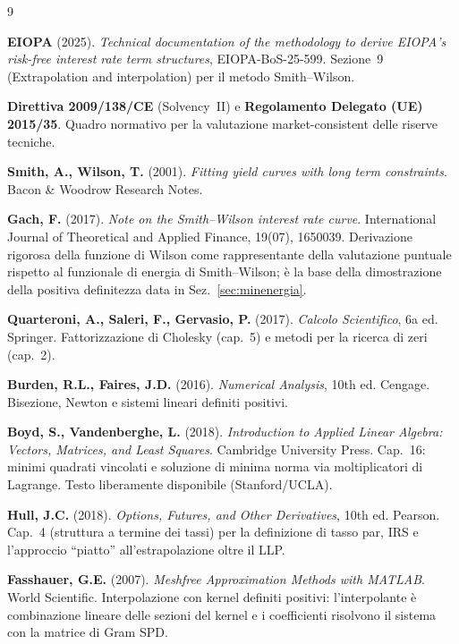 \documentclass[11pt,a4paper]{article}
\theoremstyle{plain}
\theoremstyle{definition}
\theoremstyle{remark}
\begin{document}
\renewcommand{\refname}{Riferimenti bibliografici}
\begin{thebibliography}{9}

  \textbf{EIOPA} (2025).
  \textit{Technical documentation of the methodology to derive EIOPA's risk-free interest rate
  term structures}, EIOPA-BoS-25-599.
  Sezione~9 (Extrapolation and interpolation) per il metodo Smith--Wilson.

  \textbf{Direttiva 2009/138/CE} (Solvency~II) e
  \textbf{Regolamento Delegato (UE) 2015/35}.
  Quadro normativo per la valutazione market-consistent delle riserve tecniche.

  \textbf{Smith, A., Wilson, T.} (2001).
  \textit{Fitting yield curves with long term constraints}.
  Bacon \& Woodrow Research Notes.

  \textbf{Gach, F.} (2017).
  \textit{Note on the Smith--Wilson interest rate curve}.
  International Journal of Theoretical and Applied Finance, 19(07), 1650039.
  Derivazione rigorosa della funzione di Wilson come rappresentante della valutazione puntuale
  rispetto al funzionale di energia di Smith--Wilson; \`e la base della dimostrazione della
  positiva definitezza data in Sez.~\ref{sec:minenergia}.

  \textbf{Quarteroni, A., Saleri, F., Gervasio, P.} (2017).
  \textit{Calcolo Scientifico}, 6a ed. Springer.
  Fattorizzazione di Cholesky (cap.~5) e metodi per la ricerca di zeri (cap.~2).

  \textbf{Burden, R.L., Faires, J.D.} (2016).
  \textit{Numerical Analysis}, 10th ed. Cengage.
  Bisezione, Newton e sistemi lineari definiti positivi.

  \textbf{Boyd, S., Vandenberghe, L.} (2018).
  \textit{Introduction to Applied Linear Algebra: Vectors, Matrices, and Least Squares}.
  Cambridge University Press.
  Cap.~16: minimi quadrati vincolati e soluzione di minima norma via moltiplicatori di
  Lagrange. Testo liberamente disponibile (Stanford/UCLA).

  \textbf{Hull, J.C.} (2018).
  \textit{Options, Futures, and Other Derivatives}, 10th ed. Pearson.
  Cap.~4 (struttura a termine dei tassi) per la definizione di tasso par, IRS e
  l'approccio ``piatto'' all'estrapolazione oltre il LLP.

  \textbf{Fasshauer, G.E.} (2007).
  \textit{Meshfree Approximation Methods with MATLAB}. World Scientific.
  Interpolazione con kernel definiti positivi: l'interpolante \`e combinazione lineare delle
  sezioni del kernel e i coefficienti risolvono il sistema con la matrice di Gram SPD.


\end{thebibliography}
\end{document}
